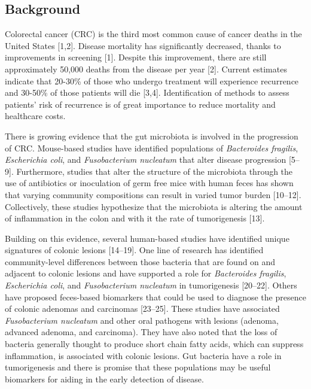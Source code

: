 \documentclass[12pt,]{article}
\begin{document}
\newpage

\linenumbers

\subsection{Background}\label{background}

Colorectal cancer (CRC) is the third most common cause of cancer deaths
in the United States {[}1,2{]}. Disease mortality has significantly
decreased, thanks to improvements in screening {[}1{]}. Despite this
improvement, there are still approximately 50,000 deaths from the
disease per year {[}2{]}. Current estimates indicate that 20-30\% of
those who undergo treatment will experience recurrence and 30-50\% of
those patients will die {[}3,4{]}. Identification of methods to assess
patients' risk of recurrence is of great importance to reduce mortality
and healthcare costs.

There is growing evidence that the gut microbiota is involved in the
progression of CRC. Mouse-based studies have identified populations of
\emph{Bacteroides fragilis}, \emph{Escherichia coli}, and
\emph{Fusobacterium nucleatum} that alter disease progression
{[}5--9{]}. Furthermore, studies that alter the structure of the
microbiota through the use of antibiotics or inoculation of germ free
mice with human feces has shown that varying community compositions can
result in varied tumor burden {[}10--12{]}. Collectively, these studies
hypothesize that the microbiota is altering the amount of inflammation
in the colon and with it the rate of tumorigenesis {[}13{]}.

Building on this evidence, several human-based studies have identified
unique signatures of colonic lesions {[}14--19{]}. One line of research
has identified community-level differences between those bacteria that
are found on and adjacent to colonic lesions and have supported a role
for \emph{Bacteroides fragilis}, \emph{Escherichia coli}, and
\emph{Fusobacterium nucleatum} in tumorigenesis {[}20--22{]}. Others
have proposed feces-based biomarkers that could be used to diagnose the
presence of colonic adenomas and carcinomas {[}23--25{]}. These studies
have associated \emph{Fusobacterium nucleatum} and other oral pathogens
with lesions (adenoma, advanced adenoma, and carcinoma). They have also
noted that the loss of bacteria generally thought to produce short chain
fatty acids, which can suppress inflammation, is associated with colonic
lesions. Gut bacteria have a role in tumorigenesis and there is promise
that these populations may be useful biomarkers for aiding in the early
detection of disease.
\end{document}
